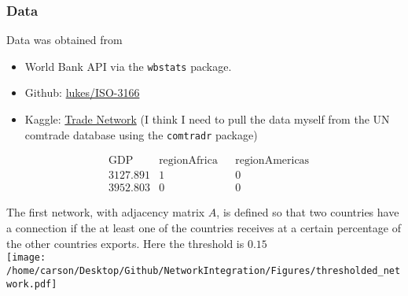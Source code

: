 \documentclass[notheorems]{beamer}
\theoremstyle{definition}
\begin{document}
\begin{frame}[fragile]
\frametitle{Data}
Data was obtained from 
\begin{itemize}
\item World Bank API via the 
\verb|wbstats| package. 
\item Github: \href{https://github.com/lukes/ISO-3166-Countries-with-Regional-Codes}{lukes/ISO-3166} 
\item Kaggle: \href{https://www.kaggle.com/datasets/yasirtariq/tradenetwork}{Trade Network} (I think I need to pull the data myself from the UN comtrade database using the \verb|comtradr| package)
\end{itemize}

\begin{align*}
&\text{GDP} & \text{regionAfrica} && \text{regionAmericas} \\
& 3127.891         &   1         &&  0  \\
& 3952.803         &   0         &&  0
\end{align*}
          
\end{frame}

















\begin{frame}
The first network, with adjacency matrix $A$, is defined so that two countries have a connection if the at least one of the countries receives at a certain percentage of the other countries exports. Here the threshold is $0.15$\\
\texttt{[image: /home/carson/Desktop/Github/NetworkIntegration/Figures/thresholded\_network.pdf]}

\end{frame}
\end{document}
